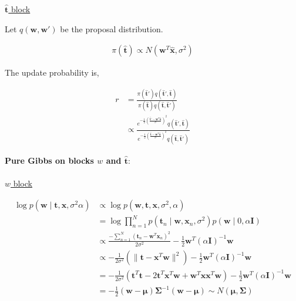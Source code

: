\documentclass[10pt]{homeworg}
\begin{document}
\underline{$\hat{\boldsymbol t}$ block}

Let $q(\boldsymbol w, \boldsymbol w')$ be the proposal distribution.

\begin{align*}
\pi(\hat{\boldsymbol t}) \propto N(\boldsymbol w^T\hat{\boldsymbol x}, \sigma^2)
\end{align*}

The update probability is,

\begin{align*}
r &= \frac{\pi(\hat{\boldsymbol t}')q(\hat{\boldsymbol t}',\hat{\boldsymbol t})}{\pi(\hat{\boldsymbol t})q(\hat{\boldsymbol t}, \hat{\boldsymbol t}')}\\
  &\propto \frac{e^{-\frac{1}{2}(\frac{\hat{\boldsymbol t}'-\boldsymbol w^T\hat{\boldsymbol x}}{\sigma})^2}q(\hat{\boldsymbol t}', \hat{\boldsymbol t})}{e^{-\frac{1}{2}(\frac{\hat{\boldsymbol t}-\boldsymbol w^T\hat{\boldsymbol x}}{\sigma})^2}q(\hat{\boldsymbol t}, \hat{\boldsymbol t}')}
\end{align*}

\newpage

\textbf{Pure Gibbs on blocks $w$ and $\hat{\boldsymbol t}$}:\\
\\
\underline{$w$ block}

\begin{align*}
\log{p(\boldsymbol w \mid \boldsymbol t,\boldsymbol x,\sigma^2\alpha)} &\propto \log{p(\boldsymbol w,\boldsymbol t,\boldsymbol x,\sigma^2,\alpha)}\\
&= \log{\prod_{n=1}^N p(\boldsymbol t_n \mid \boldsymbol w,\boldsymbol x_n,\sigma^2)p(\boldsymbol w \mid 0, \alpha \boldsymbol I)}\\
&\propto \frac{-\sum_{n=1}^N (\boldsymbol t_n-\boldsymbol w^T\boldsymbol x_n)^2}{2\sigma^2} - \frac{1}{2}\boldsymbol w^T(\alpha \boldsymbol I)^{-1}\boldsymbol w\\
&\propto -\frac{1}{2\sigma^2}(\|\boldsymbol t-\boldsymbol x^T\boldsymbol w \|^2)-\frac{1}{2}\boldsymbol w^T(\alpha \boldsymbol I)^{-1}\boldsymbol w\\
&= -\frac{1}{2\sigma^2}(\boldsymbol t^T\boldsymbol t-2\boldsymbol t^T\boldsymbol x^T\boldsymbol w+\boldsymbol w^T\boldsymbol x\boldsymbol x^T\boldsymbol w)-\frac{1}{2}\boldsymbol w^T(\alpha \boldsymbol I)^{-1}\boldsymbol w\\
&= -\frac{1}{2}(\boldsymbol w-\boldsymbol \mu)\boldsymbol \Sigma^{-1}(\boldsymbol w-\boldsymbol \mu) \sim N(\boldsymbol \mu,\boldsymbol \Sigma)
\end{align*}
\end{document}
